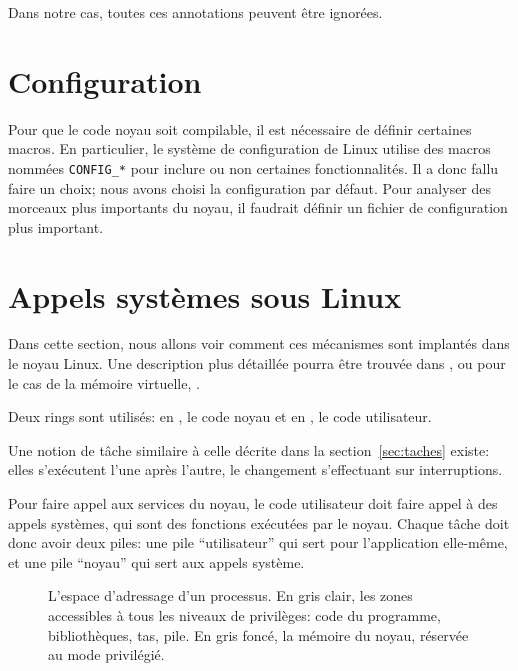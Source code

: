 Dans notre cas, toutes ces annotations peuvent être ignorées.

\section{Configuration}

Pour que le code noyau soit compilable, il est nécessaire de définir certaines
macros. En particulier, le système de configuration de Linux utilise des macros
nommées \texttt{CONFIG\_*} pour inclure ou non certaines fonctionnalités. Il a
donc fallu faire un choix; nous avons choisi la configuration par défaut. Pour
analyser des morceaux plus importants du noyau, il faudrait définir un fichier
de configuration plus important.

\section{Appels systèmes sous Linux}
\label{sec:linux-sys}

Dans cette section, nous allons voir comment ces mécanismes sont implantés dans
le noyau Linux. Une description plus détaillée pourra être trouvée dans
\cite{UnderstandingTheLinuxKernel}, ou pour le cas de la mémoire virtuelle,
\cite{LinuxVMM}.

Deux rings sont utilisés: en , le code noyau et en , le code
utilisateur.

Une notion de tâche similaire à celle décrite dans la section~\ref{sec:taches}
existe: elles s'exécutent l'une après l'autre, le changement s'effectuant sur
interruptions.

Pour faire appel aux services du noyau, le code utilisateur doit faire appel à
des appels systèmes, qui sont des fonctions exécutées par le noyau. Chaque tâche
doit donc avoir deux piles: une pile ``utilisateur'' qui sert pour
l'application elle-même, et une pile ``noyau'' qui sert aux appels système.

\begin{figure} %
\centering


\caption[Espace d'adressage d'un processus]{L'espace d'adressage d'un processus.
En gris clair, les zones accessibles à tous les niveaux de privilèges: code du
programme, bibliothèques, tas, pile. En gris foncé, la mémoire du noyau,
réservée au mode privilégié.}

\label{fig:memmap}
\end{figure}

